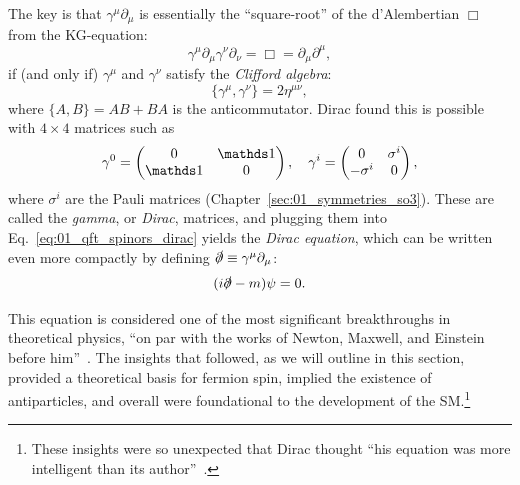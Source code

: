 The key is that $\gamma^\mu\partial_\mu$ is essentially the ``square-root'' of the d'Alembertian $\Box$ from the KG-equation:
\begin{equation}
	\label{eq:01_qft_spinors_dirac_wave}
	\gamma^\mu \partial_\mu \gamma^\nu \partial_\nu = \Box = \partial_\mu \partial^\mu,
\end{equation}
if (and only if) $\gamma^\mu$ and $\gamma^\nu$ satisfy the \textit{Clifford algebra}:
\begin{equation}
	\label{eq:01_qft_spinors_clifford_algebra}
	\{\gamma^\mu, \gamma^\nu\} = 2\eta^{\mu\nu},
\end{equation}
where $\{A, B\} = AB + BA$ is the anticommutator.
Dirac found this is possible with $4\times 4$ matrices such as
\begin{equation}
	\label{eq:01_qft_spinors_gamma_matrices_weyl_basis}
	\gamma^0 = \begin{pmatrix} 0 & \identity \\ \identity & 0 \end{pmatrix}, \quad
	\gamma^i = \begin{pmatrix} 0 & \sigma^i \\ -\sigma^i & 0 \end{pmatrix},
\end{equation}
where $\sigma^i$ are the Pauli matrices (Chapter~\ref{sec:01_symmetries_so3}).
These are called the \textit{gamma}, or \textit{Dirac}, matrices, and plugging them into Eq.~\ref{eq:01_qft_spinors_dirac} yields the \textit{Dirac equation}, which can be written even more compactly by defining $\cslashed{\partial} \equiv \gamma^\mu \partial_\mu$:
\begin{equation}
	\label{eq:01_qft_spinors_dirac_slash}
	(i\cslashed{\partial} - m)\psi = 0.
\end{equation}

This equation is considered one of the most significant breakthroughs in theoretical physics, ``on par with the works of Newton, Maxwell, and Einstein before him''~\cite{hey2003new}.
The insights that followed, as we will outline in this section, provided a theoretical basis for fermion spin, implied the existence of antiparticles, and overall were foundational to the development of the SM.\footnote{These insights were so unexpected that Dirac thought ``his equation was more intelligent than its author''~\cite{brown1983birth}.}

